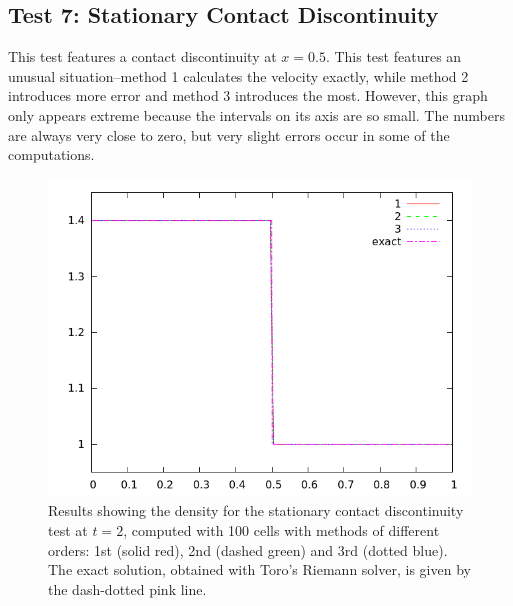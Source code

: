 \documentclass[10pt]{article}
\begin{document}
\clearpage

\subsection{Test 7: Stationary Contact Discontinuity}
This test features a contact discontinuity at $x=0.5$. This test features an unusual situation--method 1 calculates the velocity exactly, while method 2 introduces more error and method 3 introduces the most. However, this graph only appears extreme because the intervals on its axis are so small. The numbers are always very close to zero, but very slight errors occur in some of the computations. 

\begin{figure}[h]
  \begin{center}
     \includegraphics[width=.95\textwidth]{den_T7.png}	
  \end{center}
  \caption{Results showing the density for the stationary contact discontinuity test at $t=2$, computed with 100 cells with methods of different orders: 1st (solid red), 2nd (dashed green) and 3rd (dotted blue). The exact solution, obtained with Toro's Riemann solver, is given by the dash-dotted pink line.}
  \label{fig:den_T7}
\end{figure}
\end{document}
